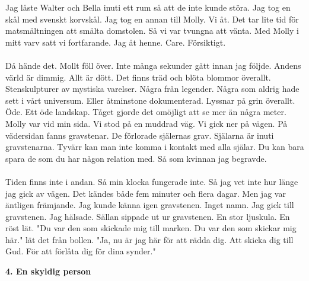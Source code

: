 \documentclass[]{article}
\begin{document}
Jag låste Walter och Bella inuti ett rum så att de inte kunde störa. Jag tog en skål med svenskt korvskål. Jag tog en annan till Molly. Vi åt. Det tar lite tid för matsmältningen att smälta domstolen. Så vi var tvungna att vänta. Med Molly i mitt varv satt vi fortfarande. Jag åt henne. Care. Försiktigt.
\\ \\
Då hände det. Mollt föll över. Inte många sekunder gått innan jag följde. Andens värld är dimmig. Allt är dött. Det finns träd och blöta blommor överallt. Stenskulpturer av mystiska varelser. Några från legender. Några som aldrig hade sett i vårt universum. Eller åtminstone dokumenterad. Lyssnar på grin överallt. Öde. Ett öde landskap. Tåget gjorde det omöjligt att se mer än några meter. Molly var vid min sida. Vi stod på en muddrad väg. Vi gick ner på vägen. På vädersidan fanns gravstenar. De förlorade själernas grav. Själarna är inuti gravstenarna. Tyvärr kan man inte komma i kontakt med alla själar. Du kan bara spara de som du har någon relation med. Så som kvinnan jag begravde.
\\ \\
Tiden finns inte i andan. Så min klocka fungerade inte. Så jag vet inte hur länge jag gick av vägen. Det kändes både fem minuter och flera dagar. Men jag var äntligen främjande. Jag kunde känna igen gravstenen. Inget namn. Jag gick till gravstenen. Jag hälsade. Sällan sippade ut ur gravstenen. En stor ljuskula. En röst lät. "Du var den som skickade mig till marken. Du var den som skickar mig här." lät det från bollen. "Ja, nu är jag här för att rädda dig. Att skicka dig till Gud. För att förlåta dig för dina synder."

\begin{center}
	\large\textbf{4. En skyldig person}
\end{center}
\end{document}
